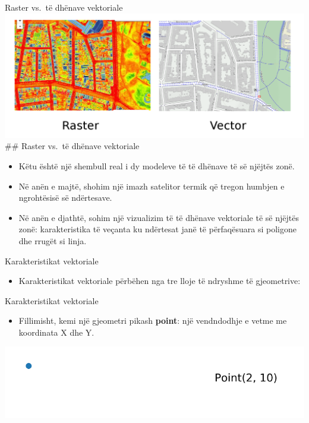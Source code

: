 \documentclass[
  ignorenonframetext,
]{beamer}
\providecommand{\tightlist}{%
  \setlength{\itemsep}{0pt}\setlength{\parskip}{0pt}}
\begin{document}
\begin{frame}{Raster vs.~të dhënave vektoriale}
\protect\hypertarget{raster-vs.-tuxeb-dhuxebnave-vektoriale}{}
\includegraphics{./Figs/rasvec2.png} \#\# Raster vs.~të dhënave
vektoriale

\begin{itemize}
\item
  Këtu është një shembull real i dy modeleve të të dhënave të së njëjtës
  zonë.
\item
  Në anën e majtë, shohim një imazh satelitor termik që tregon humbjen e
  ngrohtësisë së ndërtesave.
\item
  Në anën e djathtë, sohim një vizualizim të të dhënave vektoriale të së
  njëjtës zonë: karakteristika të veçanta ku ndërtesat janë të
  përfaqësuara si poligone dhe rrugët si linja.
\end{itemize}
\end{frame}

\begin{frame}{Karakteristikat vektoriale}
\protect\hypertarget{karakteristikat-vektoriale}{}
\begin{itemize}
\tightlist
\item
  Karakteristikat vektoriale përbëhen nga tre lloje të ndryshme të
  gjeometrive:
\end{itemize}
\end{frame}

\begin{frame}{Karakteristikat vektoriale}
\protect\hypertarget{karakteristikat-vektoriale-1}{}
\begin{itemize}
\tightlist
\item
  Fillimisht, kemi një gjeometri pikash \textbf{point}: një vendndodhje
  e vetme me koordinata X dhe Y.
\end{itemize}

\includegraphics{./Figs/point.png}
\end{frame}
\end{document}
